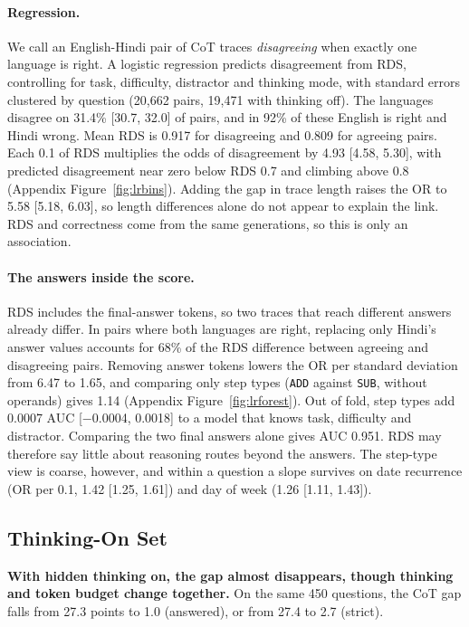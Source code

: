 \documentclass[11pt]{article}
\begin{document}
\paragraph{Regression.}
We call an English-Hindi pair of CoT traces \emph{disagreeing} when exactly one language is right. A logistic regression predicts disagreement from RDS, controlling for task, difficulty, distractor and thinking mode, with standard errors clustered by question (20,662 pairs, 19,471 with thinking off). The languages disagree on 31.4\% [30.7, 32.0] of pairs, and in 92\% of these English is right and Hindi wrong. Mean RDS is 0.917 for disagreeing and 0.809 for agreeing pairs. Each 0.1 of RDS multiplies the odds of disagreement by 4.93 [4.58, 5.30], with predicted disagreement near zero below RDS 0.7 and climbing above 0.8 (Appendix Figure~\ref{fig:lrbins}). Adding the gap in trace length raises the OR to 5.58 [5.18, 6.03], so length differences alone do not appear to explain the link. RDS and correctness come from the same generations, so this is only an association.

\paragraph{The answers inside the score.}
RDS includes the final-answer tokens, so two traces that reach different answers already differ. In pairs where both languages are right, replacing only Hindi's answer values accounts for 68\% of the RDS difference between agreeing and disagreeing pairs. Removing answer tokens lowers the OR per standard deviation from 6.47 to 1.65, and comparing only step types (\texttt{ADD} against \texttt{SUB}, without operands) gives 1.14 (Appendix Figure~\ref{fig:lrforest}). Out of fold, step types add 0.0007 AUC [$-$0.0004, 0.0018] to a model that knows task, difficulty and distractor. Comparing the two final answers alone gives AUC 0.951. RDS may therefore say little about reasoning routes beyond the answers. The step-type view is coarse, however, and within a question a slope survives on date recurrence (OR per 0.1, 1.42 [1.25, 1.61]) and day of week (1.26 [1.11, 1.43]).

\subsection{Thinking-On Set}
\label{sec:ron}

\textbf{With hidden thinking on, the gap almost disappears, though thinking and token budget change together.} On the same 450 questions, the CoT gap falls from 27.3 points to 1.0 (answered), or from 27.4 to 2.7 (strict).
\end{document}
